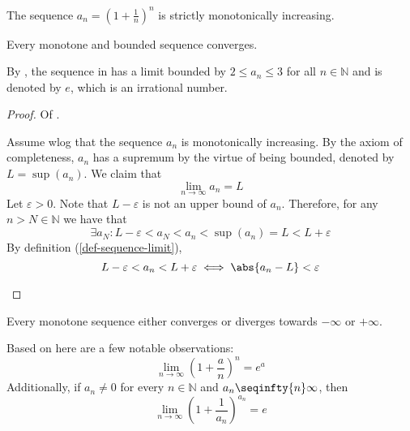 \begin{thm}\label{thm-euler-sequence-monotonicity-increasing}
	The sequence $a_n=\left(1+\tfrac{1}{n}\right)^n$ is strictly monotonically increasing.
\end{thm}

\begin{thm}\label{thm-monotone-bounded-sequence-converges}
	Every monotone and bounded sequence converges.
\end{thm}

\begin{rem}\label{rem-euler-sequence}
	By , the sequence in
	 has a limit bounded
	by $2 \leq a_n \leq 3$ for all $n\in\mathbb{N}$ and is denoted by $e$, which
	is an irrational number.
\end{rem}

\begin{proof}
	Of .
	\begin{flushleft}
		Assume \gls{wlog} that the sequence $a_n$ is monotonically increasing.
		By the axiom of completeness, $a_n$ has a supremum by the virtue of being
		bounded, denoted by $L=\sup(a_n)$. We claim that
		\begin{equation*}
			\lim_{n\to\infty}a_n=L
		\end{equation*}
		Let $\varepsilon>0$. Note that $L-\varepsilon$ is not an upper bound of
		$a_n$. Therefore, for any $n>N\in\mathbb{N}$ we have that
		\begin{equation*}
			\exists a_N: L - \varepsilon < a_N < a_n < \sup(a_n) = L < L + \varepsilon
		\end{equation*}
		By definition (\ref{def-sequence-limit}),
		\begin{equation*}
			L - \varepsilon < a_n < L + \varepsilon \iff \abs{a_n - L} < \varepsilon
		\end{equation*}
	\end{flushleft}
\end{proof}

\begin{thm}\label{thm-monotone-sequence-converges-diverges}
	Every monotone sequence either converges or diverges towards $-\infty$ or $+\infty$.
\end{thm}

\begin{rem}
	Based on  here are
	a few notable observations:
	\begin{equation}
		\lim_{n\to\infty}\left(1+\frac{a}{n}\right)^n=e^a
	\end{equation}
	Additionally, if $a_n\neq0$ for every $n\in\mathbb{N}$ and $a_n \seqinfty{n} \infty$, then
	\begin{equation}
		\lim_{n\to\infty}\left(1+\frac{1}{a_n}\right)^{a_n}=e
	\end{equation}
\end{rem}


